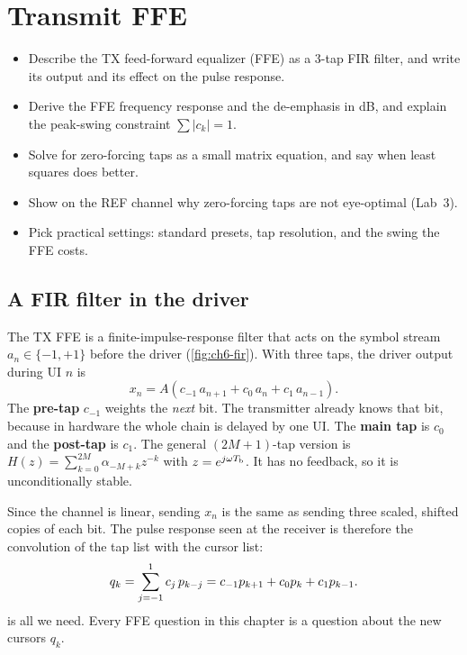 \chapter{Transmit FFE}\label{ch:txffe}
\suppressfloats[t]

\begin{objectives}
\begin{itemize}
  \item Describe the TX feed-forward equalizer (FFE) as a 3-tap FIR filter, and write its output and its effect on the pulse response.
  \item Derive the FFE frequency response and the de-emphasis in dB, and explain the peak-swing constraint $\sum\lvert c_k\rvert=1$.
  \item Solve for zero-forcing taps as a small matrix equation, and say when least squares does better.
  \item Show on the REF channel why zero-forcing taps are not eye-optimal (Lab~3).
  \item Pick practical settings: standard presets, tap resolution, and the swing the FFE costs.
\end{itemize}
\end{objectives}

\section{A FIR filter in the driver}\label{sec:ch6-fir}

The TX FFE is a finite-impulse-response filter that acts on the symbol stream $a_n\in\{-1,+1\}$ before the driver (\cref{fig:ch6-fir}). With three taps, the driver output during UI $n$ is
\begin{equation}
  x_n=A\left(c_{-1}\,a_{n+1}+c_0\,a_n+c_1\,a_{n-1}\right).
  \label{eq:ch6-fir}
\end{equation}
The \textbf{pre-tap} $c_{-1}$ weights the \emph{next} bit. The transmitter already knows that bit, because in hardware the whole chain is delayed by one UI. The \textbf{main tap} is $c_0$ and the \textbf{post-tap} is $c_1$. The general $(2M+1)$-tap version is $H(z)=\sum_{k=0}^{2M}\alpha_{-M+k}z^{-k}$ with $z=e^{j\omega T_\mathrm{b}}$. It has no feedback, so it is unconditionally stable.

Since the channel is linear, sending $x_n$ is the same as sending three scaled, shifted copies of each bit. The pulse response seen at the receiver is therefore the convolution of the tap list with the cursor list:
\begin{equation}
  q_k=\sum_{j=-1}^{1}c_j\,p_{k-j}=c_{-1}p_{k+1}+c_0p_{k}+c_1p_{k-1}.
  \label{eq:ch6-conv}
\end{equation}
 is all we need. Every FFE question in this chapter is a question about the new cursors $q_k$.

